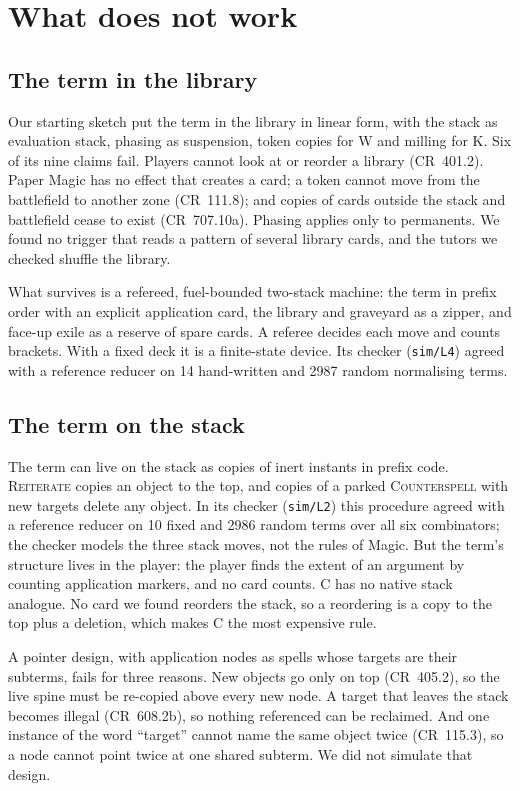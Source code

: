 \documentclass[11pt]{article}
\theoremstyle{definition}
\newcommand{\card}[1]{{\mdseries\scshape #1}}
\newcommand{\CR}[1]{CR~#1}
\begin{document}
\section{What does not work}\label{sec:fails}

\subsection{The term in the library}

Our starting sketch put the term in the library in linear form, with the stack as
evaluation stack, phasing as suspension, token copies for W and milling for K. Six of its
nine claims fail. Players cannot look at or reorder a library (\CR{401.2}). Paper Magic has
no effect that creates a card; a token cannot move from the battlefield to another zone
(\CR{111.8}); and copies of cards outside the stack and battlefield cease to exist
(\CR{707.10a}). Phasing applies only to permanents. We found no trigger that reads a
pattern of several library cards, and the tutors we checked shuffle the library.

What survives is a refereed, fuel-bounded two-stack machine: the term in prefix order with
an explicit application card, the library and graveyard as a zipper, and face-up exile as
a reserve of spare cards. A referee decides each move and counts brackets. With a fixed
deck it is a finite-state device. Its checker (\texttt{sim/L4}) agreed with a reference
reducer on 14 hand-written and 2987 random normalising terms.

\subsection{The term on the stack}

The term can live on the stack as copies of inert instants in prefix code. \card{Reiterate}
copies an object to the top, and copies of a parked \card{Counterspell} with new targets
delete any object. In its checker (\texttt{sim/L2}) this procedure agreed with a
reference reducer on 10 fixed and 2986 random terms over all six combinators; the
checker models the three stack moves, not the rules of Magic. But the
term's structure lives in the player: the player finds the extent of an argument by
counting application markers, and no card counts. C has no native stack analogue. No card
we found reorders the stack, so a reordering is a copy to the top plus a deletion, which
makes C the most expensive rule.

A pointer design, with application nodes as spells whose targets are their subterms,
fails for three reasons. New objects go only on top (\CR{405.2}), so the live spine must be
re-copied above every new node. A target that leaves the stack becomes illegal
(\CR{608.2b}), so nothing referenced can be reclaimed. And one instance of the word
``target'' cannot name the same object twice (\CR{115.3}), so a node cannot point twice at
one shared subterm. We did not simulate that design.
\end{document}
